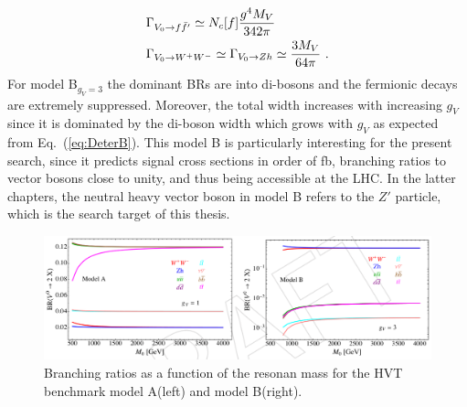 \begin{align}
  &\Gamma_{V_{0}\rightarrow f\bar{f}'}\simeq N_{c}[f]\frac{g^{4}M_{V}}{342\pi}\nonumber\\
  &\Gamma_{V_{0}\rightarrow W^{+}W^{-}}\simeq \Gamma_{V_{0}\rightarrow Zh}\simeq \frac{3M_{V}}{64\pi}\textup{ .}
\end{align}
For model B$_{g_{V}=3}$ the dominant BRs are into di-bosons and the fermionic decays are extremely suppressed. Moreover, the total width increases with increasing $g_{V}$ since it is dominated by the di-boson width which grows with $g_{V}$ as expected from Eq.~({\ref{eq:DeterB}}). This model B is particularly interesting for the present search, since it predicts signal cross sections in order of fb\cite{CMS_AN_2015-186}, branching ratios to vector bosons close to unity, and thus being accessible at the LHC. In the latter chapters, the neutral heavy vector boson in model B refers to the $Z'$ particle, which is the search target of this thesis.
\begin{figure}[h]
  \begin{center}
    \includegraphics[width=\textwidth]{figure/CH1/BRs_modelAvsB.png}
  \end{center}
  \caption{\label{fig:BRs_AvsB}Branching ratios as a function of the resonan mass for the HVT benchmark model A(left) and model B(right).}
\end{figure}
